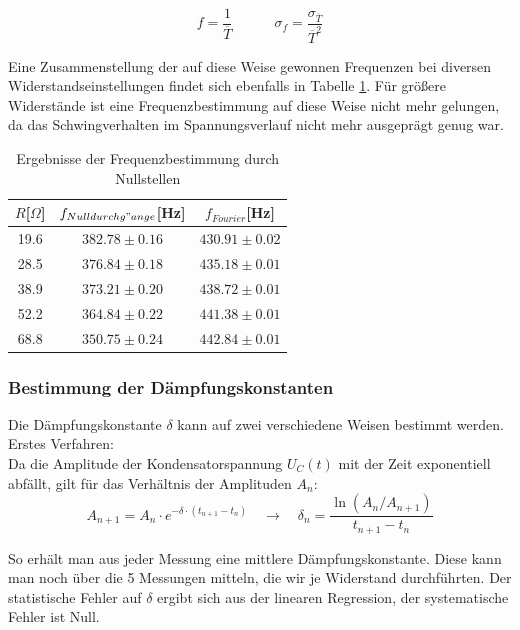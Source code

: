 \documentclass[12pt,a4paper]{article}
\begin{document}
\begin{equation}
f=\frac{1}{\overline{T}} \quad \quad \quad
\sigma_f=\frac{\sigma_{\overline{T}}}{\overline{T}^2}
\end{equation}

Eine Zusammenstellung der auf diese Weise gewonnen Frequenzen bei diversen Widerstandseinstellungen findet sich ebenfalls in Tabelle \ref{tab:Frequenzen}. Für größere Widerstände ist eine Frequenzbestimmung auf diese Weise nicht mehr gelungen, da das Schwingverhalten im Spannungsverlauf nicht mehr ausgeprägt genug war.

\begin{table}
\begin{center}
\begin{tabular}{|c|c|c|}
\hline
$R$[$\Omega$] & $f_{Nulldurchg"ange}$[Hz] & $f_{Fourier}$[Hz] \\
\hline
 19.6 & $382.78 \pm 0.16$ & $430.91 \pm 0.02$\\
\hline
 28.5 & $376.84 \pm 0.18$ & $435.18 \pm 0.01$\\
\hline
 38.9 & $373.21 \pm 0.20$ & $438.72 \pm 0.01$\\
\hline
 52.2 & $364.84 \pm 0.22$ & $441.38 \pm 0.01$\\
\hline
 68.8 & $350.75 \pm 0.24$ & $442.84 \pm 0.01$\\
\hline
\end{tabular}
\end{center}
\caption{Ergebnisse der Frequenzbestimmung durch Nullstellen}
\label{tab:Frequenzen}
\end{table}



\subsubsection{Bestimmung der Dämpfungskonstanten}
Die Dämpfungskonstante $\delta$ kann auf zwei verschiedene Weisen bestimmt werden.\\

Erstes Verfahren:\\
Da die Amplitude der Kondensatorspannung $U_C(t)$ mit der Zeit exponentiell abfällt, gilt für das Verhältnis der Amplituden $A_n$:
\begin{equation}
A_{n+1} = A_n \cdot e^{-\delta \cdot (t_{n+1} - t_n)} \quad \rightarrow \quad \delta_n = \frac{\ln ( A_n / A_{n+1})}{t_{n+1}-t_n}
\end{equation}

So erhält man aus jeder Messung eine mittlere Dämpfungskonstante. Diese kann man noch über die 5 Messungen mitteln, die wir je Widerstand durchführten. Der statistische Fehler auf $\delta$ ergibt sich aus der linearen Regression, der systematische Fehler ist Null.\\
\end{document}
